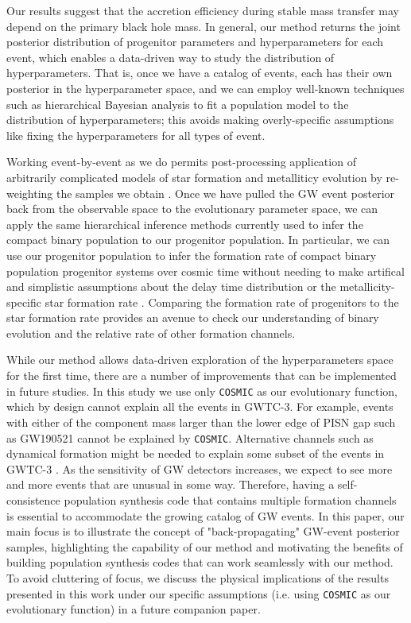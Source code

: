 \documentclass[twocolumn]{aastex631}
\begin{document}
Our results suggest that the accretion efficiency during stable mass transfer
may depend on the primary black hole mass.  In general, our method returns the
joint posterior distribution of progenitor parameters and hyperparameters for
each event, which enables a data-driven way to study the distribution of
hyperparameters.  That is, once we have a catalog of events, each has their own
posterior in the hyperparameter space, and we can employ well-known techniques
such as hierarchical Bayesian analysis to fit a population model to the
distribution of hyperparameters; this avoids making overly-specific assumptions
like fixing the hyperparameters for all types of event.

Working event-by-event as we do permits post-processing application of
arbitrarily complicated models of star formation and metalliticy evolution by
re-weighting the samples we obtain \citep[e.g.][]{VanSon2022}. Once we have
pulled the GW event posterior back from the observable space to the evolutionary
parameter space, we can apply the same hierarchical inference methods currently
used to infer the compact binary population to our progenitor population.  In
particular, we can use our progenitor population to infer the formation rate of
compact binary population progenitor systems over cosmic time without needing to
make artifical and simplistic assumptions about the delay time distribution or
the metallicity-specific star formation rate
\citep{Vitale2019,Ng2021,VanSon2022}.  Comparing the formation rate of
progenitors to the star formation rate provides an avenue to check our
understanding of binary evolution and the relative rate of other formation
channels.

While our method allows data-driven exploration of the hyperparameters space for the first time, there are a number of improvements that can be implemented in future studies.
In this study we use only \texttt{COSMIC} as our evolutionary function, which by design cannot explain all the events in GWTC-3.
For example, events with either of the component mass larger than the lower edge of PISN gap such as GW190521 cannot be explained by \texttt{COSMIC}.
Alternative channels such as dynamical formation might be needed to explain some subset of the events in GWTC-3 \citep{Zevin2021}.
As the sensitivity of GW detectors increases, we expect to see more and more events that are unusual in some way.
Therefore, having a self-consistence population synthesis code that contains multiple formation channels is essential to accommodate the growing catalog of GW events.
In this paper, our main focus is to illustrate the concept of "back-propagating" GW-event posterior samples,
highlighting the capability of our method and motivating the benefits of building population synthesis codes that can work seamlessly with our method.
To avoid cluttering of focus, we discuss the physical implications of the results presented in this work under our specific assumptions (i.e. using \texttt{COSMIC} as our evolutionary function) in a future companion paper.
\end{document}
